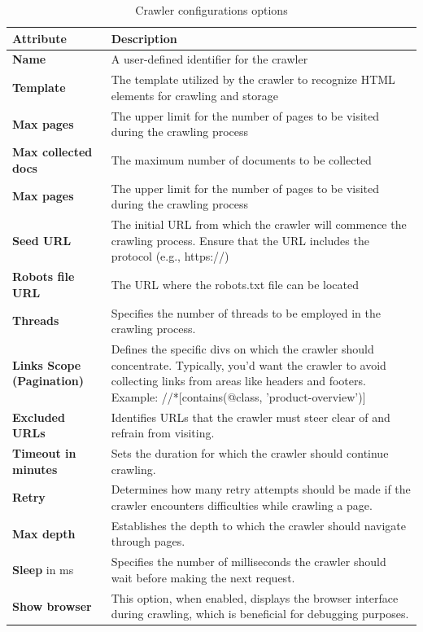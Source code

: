 \begin{table}[ht] 
{\footnotesize
\begin{tabular}{ |p{2.5cm}||p{10.3cm}|  }
\hline \hline
\textbf{Attribute} & \textbf{Description}\T\B 
\\ 
\hline
\textbf{Name} & A user-defined identifier for the crawler \T\B 
\\ 
\hline
\textbf{Template} & The template utilized by the crawler to recognize HTML elements for crawling and storage \T\B 
\\ 
\hline
\textbf{Max pages} & The upper limit for the number of pages to be visited during the crawling process \T\B 
\\ 
\hline
\textbf{Max collected docs} & The maximum number of documents to be collected \T\B 
\\ 
\hline
\textbf{Max pages} & The upper limit for the number of pages to be visited during the crawling process \T\B 
\\ 
\hline
\textbf{Seed URL} & The initial URL from which the crawler will commence the crawling process. Ensure that the URL includes the protocol (e.g., https://) \T\B 
\\ 
\hline
\textbf{Robots file URL} & The URL where the robots.txt file can be located \T\B 
\\ 
\hline
\textbf{Threads} & Specifies the number of threads to be employed in the crawling process. \T\B 
\\ 
\hline
\textbf{Links Scope (Pagination)} & Defines the specific divs on which the crawler should concentrate. Typically, you'd want the crawler to avoid collecting links from areas like headers and footers. Example: //*[contains(@class, 'product-overview')] \T\B 
\\ 
\hline
\textbf{Excluded URLs} & Identifies URLs that the crawler must steer clear of and refrain from visiting. \T\B 
\\ 
\hline
\textbf{Timeout in minutes} & Sets the duration for which the crawler should continue crawling.\\ 
\hline
\textbf{Retry} & Determines how many retry attempts should be made if the crawler encounters difficulties while crawling a page. \T\B 
\\ 
\hline
\textbf{Max depth} & Establishes the depth to which the crawler should navigate through pages. \T\B 
\\ 
\hline
\textbf{Sleep} in ms & Specifies the number of milliseconds the crawler should wait before making the next request. \T\B 
\\ 
\hline
\textbf{Show browser} & This option, when enabled, displays the browser interface during crawling, which is beneficial for debugging purposes. \T\B 
\\ 
\hline \hline
    \end{tabular}
}
  \captionsetup{justification=centering,margin=2cm}
  \caption{Crawler configurations options}
\end{table}

